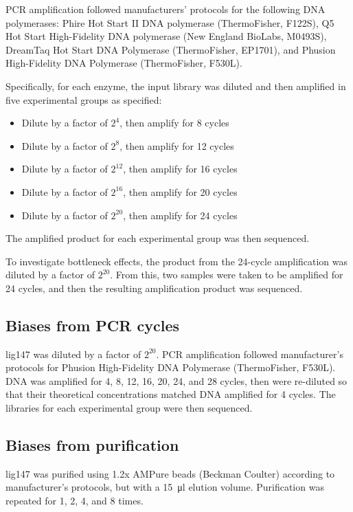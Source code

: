 \documentclass[parskip=full, numbers=noenddot]{scrbook}
\begin{document}
PCR amplification followed manufacturers' protocols for the following DNA polymerases: Phire Hot Start II DNA polymerase (ThermoFisher, F122S), Q5 Hot Start High-Fidelity DNA polymerase (New England BioLabs, M0493S), DreamTaq Hot Start DNA Polymerase (ThermoFisher, EP1701), and Phusion High-Fidelity DNA Polymerase (ThermoFisher, F530L).

Specifically, for each enzyme, the input library was diluted and then amplified in five experimental groups as specified:

\begin{itemize}
  \item Dilute by a factor of $2^{4}$, then amplify for 8 cycles
  \item Dilute by a factor of $2^{8}$, then amplify for 12 cycles
  \item Dilute by a factor of $2^{12}$, then amplify for 16 cycles
  \item Dilute by a factor of $2^{16}$, then amplify for 20 cycles
  \item Dilute by a factor of $2^{20}$, then amplify for 24 cycles
\end{itemize}

The amplified product for each experimental group was then sequenced.

To investigate bottleneck effects, the product from the 24-cycle amplification was diluted by a factor of $2^{20}$.  From this, two samples were taken to be amplified for 24 cycles, and then the resulting amplification product was sequenced.

\subsection{Biases from PCR cycles}
\label{ssec:pcrbias_methods_pcr}

lig147 was diluted by a factor of $2^{20}$.  PCR amplification followed manufacturer's protocols for Phusion High-Fidelity DNA Polymerase (ThermoFisher, F530L).  DNA was amplified for 4, 8, 12, 16, 20, 24, and 28 cycles, then were re-diluted so that their theoretical concentrations matched DNA amplified for 4 cycles.  The libraries for each experimental group were then sequenced.

\subsection{Biases from purification}
\label{ssec:pcrbias_methods_pur}

lig147 was purified using 1.2x AMPure beads (Beckman Coulter) according to manufacturer's protocols, but with a \SI{15}{\micro\litre} elution volume.  Purification was repeated for 1, 2, 4, and 8 times.
\end{document}
